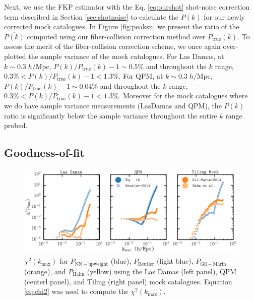 \documentclass{emulateapj}
\begin{document}
Next, we use the FKP estimator with the Eq. \ref{eq:ourshot} shot-noise correction term described in Section \ref{sec:shotnoise} to calculate the $P(k)$ for our newly corrected mock catalogues. In Figure \ref{fig:peaksn} we present the ratio of the $\overline{P(k)}$ computed using our fiber-collision correction method over $P_\mathrm{true}(k)$. To assess the merit of the fiber-collision correction scheme, we once again over-plotted the sample variance of the mock catalogues. For Las Damas, at $k \sim 0.3 \; h/\mathrm{Mpc}$, $P(k)/P_\mathrm{true}(k) - 1 \sim 0.5 \%$ and throughout the $k$ range, $0.3 \% < P(k)/P_\mathrm{true}(k) - 1 < 1.3 \%$. For QPM, at $k \sim 0.3 \; h/\mathrm{Mpc}$, $P(k)/P_\mathrm{true}(k) - 1 \sim 0.04 \%$ and throughout the $k$ range, $0.3 \% < P(k)/P_\mathrm{true}(k) - 1 < 1.3 \%$. %
Moreover for the mock catalogues where we do have sample variance measurements (LasDamas and QPM), the $P(k)$ ratio is significantly below the sample variance throughout the entire $k$ range probed.

\subsection{Goodness-of-fit} \label{sec:litcomp}
\begin{figure} 
\begin{center}
\includegraphics[scale=0.55]{fcpaper_pk_chisquared_comparison.png} 
\caption{$\chi^2 (k_\mathrm{max})$ for $P_\mathrm{NN-upweight}$ (blue), $P_\mathrm{Beutler}$ (light blue), $P_\mathrm{Gil-Marin}$ (orange), and $P_\mathrm{Hahn}$ (yellow) using the Las Damas (left panel), QPM (centerl panel), and Tiling (right panel) mock catalogues. Equation \ref{eq:chi2} was used to compute the $\chi^2(k_\mathrm{max})$. }\label{fig:peaksnchi2}
\end{center}
\end{figure}
\end{document}
